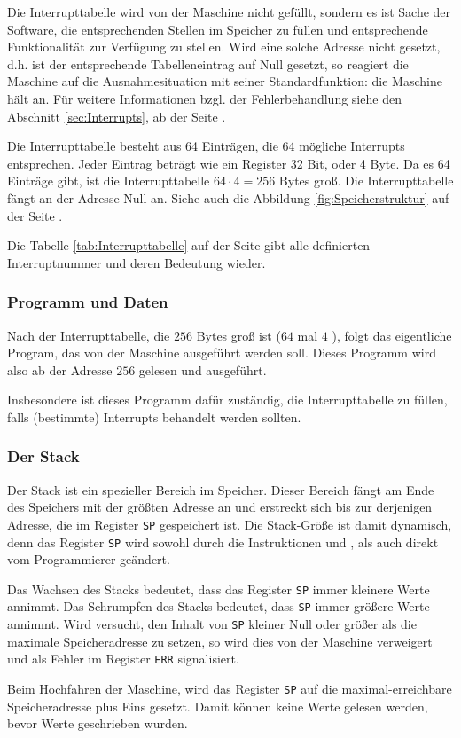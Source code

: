 Die Interrupttabelle wird von der Maschine nicht gefüllt, sondern es ist
Sache der Software, die entsprechenden Stellen im Speicher zu füllen und
entsprechende Funktionalität zur Verfügung zu stellen. Wird eine solche Adresse
nicht gesetzt, d.h. ist der entsprechende Tabelleneintrag auf Null gesetzt, so
reagiert die Maschine auf die Ausnahmesituation mit seiner Standardfunktion: die
Maschine hält an. Für weitere Informationen bzgl. der Fehlerbehandlung siehe den
Abschnitt \ref{sec:Interrupts}, ab der Seite \pageref{sec:Interrupts}.

Die Interrupttabelle besteht aus 64 Einträgen, die 64 mögliche Interrupts
entsprechen. Jeder Eintrag beträgt wie ein Register 32 Bit, oder 4 Byte. Da es
64 Einträge gibt, ist die Interrupttabelle $64 \cdot 4 = 256$ Bytes groß. Die
Interrupttabelle fängt an der Adresse Null an. Siehe auch die Abbildung
\ref{fig:Speicherstruktur} auf der Seite \pageref{fig:Speicherstruktur}.


Die Tabelle \ref{tab:Interrupttabelle} auf der Seite
\pageref{tab:Interrupttabelle} gibt alle definierten
Interruptnummer und deren Bedeutung wieder.


\subsubsection{Programm und Daten}

Nach der Interrupttabelle, die $256$ Bytes groß ist ($64$ mal $4$ ),
folgt das eigentliche Program, das von der Maschine ausgeführt werden soll.
Dieses Programm wird also ab der Adresse $256$ gelesen und ausgeführt.

Insbesondere ist dieses Programm dafür zuständig, die Interrupttabelle zu
füllen, falls (bestimmte) Interrupts behandelt werden sollten.



\subsubsection{Der Stack}
\label{subsubsec:Stack}

Der Stack ist ein spezieller Bereich im Speicher. Dieser Bereich fängt am Ende
des Speichers mit der größten Adresse an und erstreckt sich bis zur derjenigen
Adresse, die im Register \texttt{SP} gespeichert ist. Die Stack-Größe ist damit
dynamisch, denn das Register \texttt{SP} wird sowohl durch die Instruktionen
 und , als auch direkt vom Programmierer geändert.

Das Wachsen des Stacks bedeutet, dass das Register
\texttt{SP} immer kleinere Werte annimmt. Das Schrumpfen
des Stacks bedeutet, dass \texttt{SP} immer größere Werte annimmt. Wird
versucht, den Inhalt von \texttt{SP} kleiner Null oder größer als die maximale
Speicheradresse zu setzen, so wird dies von der Maschine verweigert und als
Fehler im Register \texttt{ERR} signalisiert.

Beim Hochfahren der Maschine, wird das Register \texttt{SP} auf die
maximal-erreichbare Speicheradresse plus Eins gesetzt. Damit können keine Werte
gelesen werden, bevor Werte geschrieben wurden.

